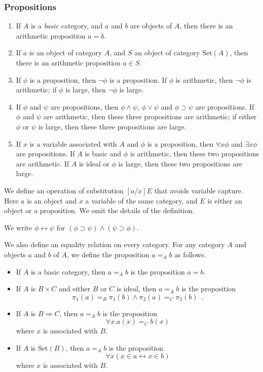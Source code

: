 \documentclass[acmtocl]{acmtrans2m}
\newcommand{\Set}[1]{\mathrm{Set} \left( {#1} \right)}
\newcommand{\boldarrow}{\Rightarrow}
\begin{document}
\subsubsection{Propositions}
\begin{enumerate}
\item
If $A$ is a \emph{basic} category, and $a$ and $b$ are objects of $A$, then there is an arithmetic proposition $a = b$.
\item
If $a$ is an object of category $A$, and $S$ an object of category $\Set{A}$, then there is an arithmetic proposition $a \in S$.
\item
If $\phi$ is a proposition, then $\neg \phi$ is a proposition.  If $\phi$ is arithmetic, then $\neg \phi$ is arithmetic; if $\phi$ is large, then $\neg \phi$ is large.
\item
If $\phi$ and $\psi$ are propositions, then $\phi \wedge \psi$, $\phi \vee \psi$ and $\phi \supset \psi$ are propositions.  If $\phi$ and $\psi$ are arithmetic, then these three propositions are arithmetic; if either $\phi$ or $\psi$ is large, then these three propositions are large.
\item
If $x$ is a variable associated with $A$ and $\phi$ is a proposition, then $\forall x \phi$ and $\exists x \phi$ are propositions.  If $A$ is basic and $\phi$ is arithmetic, then these two propositions are arithmetic.  If $A$ is ideal or $\phi$ is large, then these two propositions are large.
\end{enumerate}



We define an operation of substitution $[a/x]E$ that avoids variable capture.  Here $a$ is an object and $x$ a variable of the same category, and $E$ is either an object or a proposition.  We omit the details of the definition.

We write $\phi \leftrightarrow \psi$ for $(\phi \supset \psi) \wedge (\psi \supset \phi)$.

\pagebreak

We also define an equality relation on every category.  For any category $A$ and objects $a$ and $b$ of $A$, we define the proposition $a =_A b$ as follows.
\begin{itemize}
 \item If $A$ is a basic category, then $a =_A b$ is the proposition $a = b$.
\item If $A$ is $B \times C$ and either $B$ or $C$ is ideal, then $a =_A b$ is the proposition
\[ \pi_1(a) =_B \pi_1(b) \wedge \pi_2(a) =_C \pi_2(b) \enspace . \]
\item If $A$ is $B \boldarrow C$, then $a =_A b$ is the proposition
\[ \forall x. a(x) =_C b(x) \]
where $x$ is associated with $B$.
\item If $A$ is $\Set{B}$, then $a =_A b$ is the proposition
\[ \forall x(x \in a \leftrightarrow x \in b) \]
where $x$ is associated with $B$.
\end{itemize}
\end{document}
